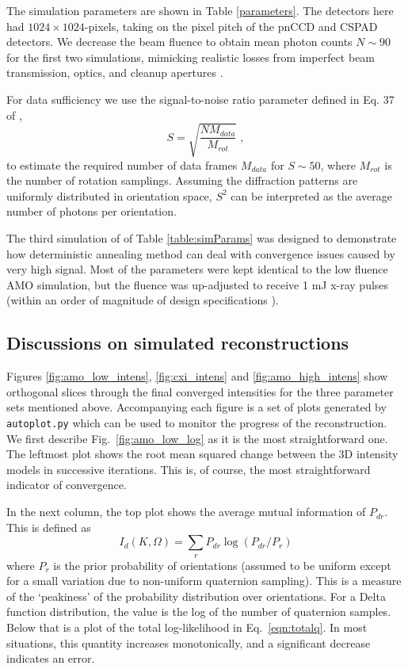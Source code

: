 \documentclass[]{iucr}              %
\begin{document}
The simulation parameters are shown in Table \ref{parameters}. The detectors here had $1024\times1024$-pixels, taking on the pixel pitch of the pnCCD\cite{Struder2010} and CSPAD\cite{hart2012} detectors. We decrease the beam fluence to obtain mean photon counts $N\sim 90$ for the first two simulations, mimicking realistic losses from imperfect beam transmission, optics, and cleanup apertures \cite{Loh2013}. 

For data sufficiency we use the signal-to-noise ratio parameter defined in Eq. 37 of , 
\begin{equation}
S = \sqrt{\frac{N M_{data}}{M_{rot}}}\; ,
\end{equation}
to estimate the required number of data frames $M_{data}$ for $S\sim50$, where $M_{rot}$ is the number of rotation samplings. Assuming the diffraction patterns are uniformly distributed in orientation space, $S^2$ can be interpreted as the average number of photons per orientation.

The third simulation of of Table \ref{table:simParams} was designed to demonstrate how deterministic annealing method can deal with convergence issues caused by very high signal. Most of the parameters were kept identical to the low fluence AMO simulation, but the fluence was up-adjusted to receive 1 mJ x-ray pulses (within an order of magnitude of design specifications \cite{Emma2010}).

\subsection{Discussions on simulated reconstructions} \label{subsec:recon}
Figures \ref{fig:amo_low_intens}, \ref{fig:cxi_intens} and \ref{fig:amo_high_intens} show orthogonal slices through the final converged intensities for the three parameter sets mentioned above. Accompanying each figure is a set of plots generated by \texttt{autoplot.py} which can be used to monitor the progress of the reconstruction. We first describe Fig.~\ref{fig:amo_low_log} as it is the most straightforward one. The leftmost plot shows the root mean squared change between the 3D intensity models in successive iterations. This is, of course, the most straightforward indicator of convergence. 

In the next column, the top plot shows the average mutual information of $P_{dr}$. This is defined as
\begin{equation}
I_d(K, \Omega) = \sum_r P_{dr} \log(P_{dr} / P_{r})
\end{equation}
where $P_r$ is the prior probability of orientations (assumed to be uniform except for a small variation due to non-uniform quaternion sampling). This is a measure of the `peakiness' of the probability distribution over orientations. For a Delta function distribution, the value is the log of the number of quaternion samples. Below that is a plot of the total log-likelihood in Eq.~\ref{eqn:totalq}. In most situations, this quantity increases monotonically, and a significant decrease indicates an error. 
\end{document}
